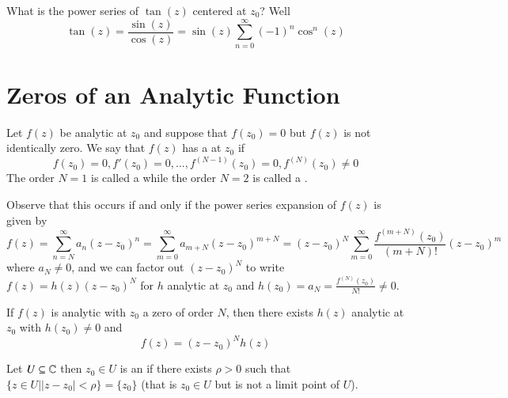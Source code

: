 \documentclass[12pt, a4paper, oneside, openright, titlepage]{book}
\begin{document}
\begin{eg}
    What is the power series of $\tan(z)$ centered at $z_0$? Well \begin{equation*}
        \tan(z) = \frac{\sin(z)}{\cos(z)} = \sin(z)\sum_{n=0}^{\infty}(-1)^n\cos^n(z)
    \end{equation*}
\end{eg}



\section{Zeros of an Analytic Function}


\begin{defn}
    Let $f(z)$ be analytic at $z_0$ and suppose that $f(z_0) = 0$ but $f(z)$ is not identically zero. We say that $f(z)$ has a  at $z_0$ if \begin{equation*}
        f(z_0) = 0, f'(z_0) = 0,...,f^{(N-1)}(z_0) = 0, f^{(N)}(z_0) \neq 0
    \end{equation*}
    The order $N = 1$ is called a  while the order $N =2$ is called a .
\end{defn}

Observe that this occurs if and only if the power series expansion of $f(z)$ is given by \begin{equation*}
    f(z) = \sum_{n=N}^{\infty}a_n(z-z_0)^n = \sum_{m=0}^{\infty}a_{m+N}(z-z_0)^{m+N} = (z-z_0)^N\sum_{m=0}^{\infty}\frac{f^{(m+N)}(z_0)}{(m+N)!}(z-z_0)^m
\end{equation*}
where $a_N \neq 0$, and we can factor out $(z-z_0)^N$ to write $f(z) = h(z)(z-z_0)^N$ for $h$ analytic at $z_0$ and $h(z_0) = a_N = \frac{f^{(N)}(z_0)}{N!} \neq 0$.

\begin{thm}
    If $f(z)$ is analytic with $z_0$ a zero of order $N$, then there exists $h(z)$ analytic at $z_0$ with $h(z_0) \neq 0$ and \begin{equation*}
        f(z) = (z-z_0)^Nh(z)
    \end{equation*}
\end{thm}


\begin{defn}
    Let $U \subseteq \mathbb C$ then $z_0 \in U$ is an  if there exists $\rho > 0$ such that $\{z \in U\vert |z-z_0| < \rho\} = \{z_0\}$ (that is $z_0 \in U$ but is not a limit point of $U$).
\end{defn}
\end{document}
